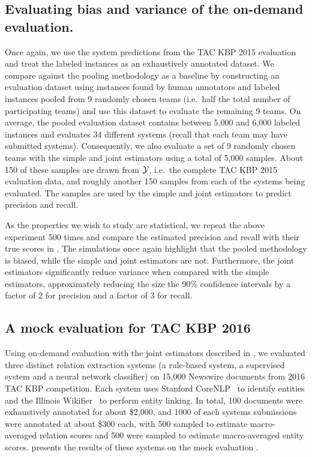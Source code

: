 \subsection{Evaluating bias and variance of the on-demand evaluation.}
Once again, we use the system predictions from the TAC KBP 2015 evaluation and treat the labeled instances as an exhaustively annotated dataset.
We compare against the pooling methodology as a baseline by constructing an evaluation dataset using instances found by human annotators and labeled instances pooled from 9 randomly chosen teams (i.e.\ half the total number of participating teams) and use this dataset to evaluate the remaining 9 teams.
On average, the pooled evaluation dataset contains between 5,000 and 6,000 labeled instances and evaluates 34 different systems (recall that each team may have submitted systems).
Consequently, we also evaluate a set of 9 randomly chosen teams with the simple and joint estimators using a total of 5,000 samples.
About 150 of these samples are drawn from $\mathcal{Y}$, i.e.\ the complete TAC KBP 2015 evaluation data, and roughly another 150 samples from each of the systems being evaluated.
The samples are used by the simple and joint estimators to predict precision and recall.

As the properties we wish to study are statistical, we repeat the above experiment 500 times and compare the estimated precision and recall with their true scores in .
The simulations once again highlight that the pooled methodology is biased, while the simple and joint estimators are not.
Furthermore, the joint estimators significantly reduce variance when compared with the simple estimators, 
approximately reducing the size the 90\% confidence intervals by a factor of 2 for precision and a factor of 3 for recall.

\subsection{A mock evaluation for TAC KBP 2016}
Using on-demand evaluation with the joint estimators described in , we evaluated three distinct relation extraction systems (a rule-based system, a supervised system and a neural network classifier) on 15,000 Newswire documents from 2016 TAC KBP competition.
Each system uses Stanford CoreNLP~\citep{} to identify entities and the Illinois Wikifier~\citep{} to perform entity linking. 
In total, 100 documents were exhaustively annotated for about \$2,000, and 1000 of each systems submissions were annotated at about \$300 each, with 500 sampled to estimate macro-averaged relation scores and 500 were sampled to estimate macro-averaged entity scores.
 presents the results of these systems on the mock evaluation .

